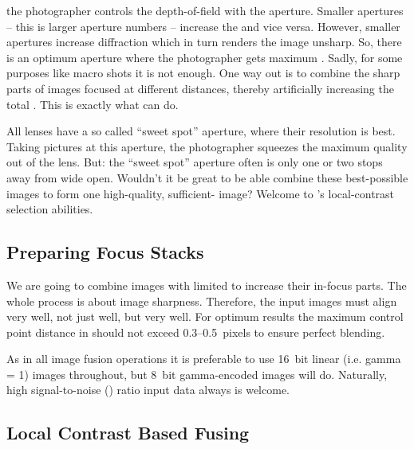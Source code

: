\noindent the photographer controls the
depth-of-field with the aperture.  Smaller
apertures -- this is larger aperture numbers -- increase the
 and vice versa.  However, smaller apertures increase
diffraction which in turn renders the image unsharp.  So, there is an
optimum aperture where the photographer gets maximum .
Sadly, for some purposes like macro shots it is not enough.  One way
out is to combine the sharp parts of images focused at different
distances, thereby artificially increasing the total .
This is exactly what \App{} can do.

All lenses have a so called ``sweet spot''
aperture, where their resolution is best.
Taking pictures at this aperture, the photographer squeezes the
maximum quality out of the lens.  But: the ``sweet spot'' aperture
often is only one or two stops away from wide open.  Wouldn't it be
great to be able combine these best-possible images to form one
high-quality, sufficient- image?  Welcome to \App{}'s
local-contrast selection abilities.


\subsection[Preparing Focus Stacks]{Preparing Focus Stacks
  \label{sec:preparing-focus-stacks}
  }

We are going to combine images with limited  to increase
their in-focus parts.  The whole process is about image sharpness.
Therefore, the input images must align very well, not just well, but
very well.  For optimum results the maximum control point distance in
 should not exceed 0.3--0.5~pixels to ensure
perfect blending.

As in all image fusion operations it is preferable to use 16~bit
linear (i.e. gamma = 1) images throughout, but 8~bit gamma-encoded
images will do.  Naturally, high
signal-to-noise
() ratio
input data always is welcome.


\subsection[Local Contrast Based Fusing]{Local Contrast Based Fusing
  \label{sec:local-contrast-based-fusing}
  }


